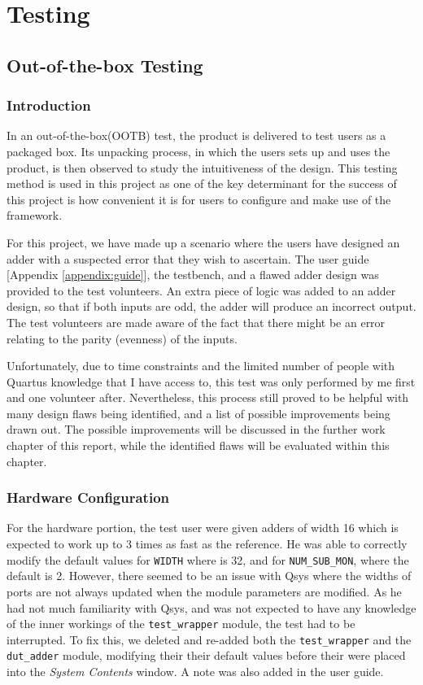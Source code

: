 \chapter{Testing}

\section{Out-of-the-box Testing}
\subsection{Introduction}
In an out-of-the-box(OOTB) test, the product is delivered to test users as a packaged box.
Its unpacking process, in which the users sets up and uses the product, is then observed to study the intuitiveness of the design.
This testing method is used in this project as one of the key determinant for the success of this project is how convenient it is for users to configure and make use of the framework.

For this project, we have made up a scenario where the users have designed an adder with a suspected error that they wish to ascertain.
The user guide [Appendix \ref{appendix:guide}], the testbench, and a flawed adder design was provided to the test volunteers.
An extra piece of logic was added to an adder design, so that if both inputs are odd, the adder will produce an incorrect output.
The test volunteers are made aware of the fact that there might be an error relating to the parity (evenness) of the inputs.

Unfortunately, due to time constraints and the limited number of people with Quartus knowledge that I have access to, this test was only performed by me first and one volunteer after.
Nevertheless, this process still proved to be helpful with many design flaws being identified, and a list of possible improvements being drawn out.
The possible improvements will be discussed in the further work chapter of this report, while the identified flaws will be evaluated within this chapter.

\subsection{Hardware Configuration}
For the hardware portion, the test user were given adders of width 16 which is expected to work up to 3 times as fast as the reference.
He was able to correctly modify the default values for \texttt{WIDTH} where is 32, and for \texttt{NUM\_SUB\_MON}, where the default is 2.
However, there seemed to be an issue with Qsys where the widths of ports are not always updated when the module parameters are modified.
As he had not much familiarity with Qsys, and was not expected to have any knowledge of the inner workings of the \texttt{test\_wrapper} module, the test had to be interrupted.
To fix this, we deleted and re-added both the \texttt{test\_wrapper} and the \texttt{dut\_adder} module, modifying their their default values before their were placed into the \textit{System Contents} window.
A note was also added in the user guide.

